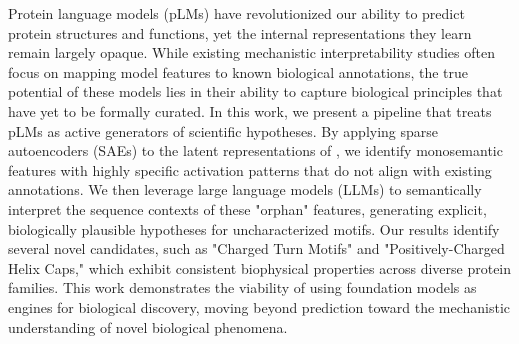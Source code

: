 Protein language models (pLMs) have revolutionized our ability to predict protein structures and functions, yet the internal representations they learn remain largely opaque. While existing mechanistic interpretability studies often focus on mapping model features to known biological annotations, the true potential of these models lies in their ability to capture biological principles that have yet to be formally curated. In this work, we present a pipeline that treats pLMs as active generators of scientific hypotheses. By applying sparse autoencoders (SAEs) to the latent representations of \esm, we identify monosemantic features with highly specific activation patterns that do not align with existing \swissprot annotations. We then leverage large language models (LLMs) to semantically interpret the sequence contexts of these "orphan" features, generating explicit, biologically plausible hypotheses for uncharacterized motifs. Our results identify several novel candidates, such as "Charged Turn Motifs" and "Positively-Charged Helix Caps," which exhibit consistent biophysical properties across diverse protein families. This work demonstrates the viability of using foundation models as engines for biological discovery, moving beyond prediction toward the mechanistic understanding of novel biological phenomena.
